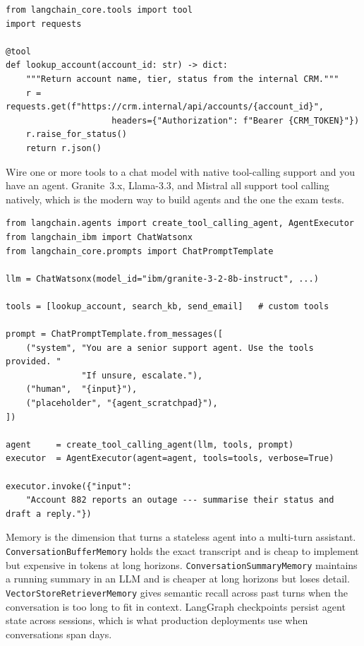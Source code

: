 \begin{examplebox}[title=\textbf{Custom tool --- query an internal CRM}]
\begin{lstlisting}[style=pythonstyle]
from langchain_core.tools import tool
import requests

@tool
def lookup_account(account_id: str) -> dict:
    """Return account name, tier, status from the internal CRM."""
    r = requests.get(f"https://crm.internal/api/accounts/{account_id}",
                     headers={"Authorization": f"Bearer {CRM_TOKEN}"})
    r.raise_for_status()
    return r.json()
\end{lstlisting}
\end{examplebox}

Wire one or more tools to a chat model with native tool-calling support and you have an agent. Granite~3.x, Llama-3.3, and Mistral all support tool calling natively, which is the modern way to build agents and the one the exam tests.

\begin{examplebox}[title=\textbf{Tool-calling agent on watsonx (Granite 3.x supports tool calls natively)}]
\begin{lstlisting}[style=pythonstyle]
from langchain.agents import create_tool_calling_agent, AgentExecutor
from langchain_ibm import ChatWatsonx
from langchain_core.prompts import ChatPromptTemplate

llm = ChatWatsonx(model_id="ibm/granite-3-2-8b-instruct", ...)

tools = [lookup_account, search_kb, send_email]   # custom tools

prompt = ChatPromptTemplate.from_messages([
    ("system", "You are a senior support agent. Use the tools provided. "
               "If unsure, escalate."),
    ("human",  "{input}"),
    ("placeholder", "{agent_scratchpad}"),
])

agent     = create_tool_calling_agent(llm, tools, prompt)
executor  = AgentExecutor(agent=agent, tools=tools, verbose=True)

executor.invoke({"input":
    "Account 882 reports an outage --- summarise their status and draft a reply."})
\end{lstlisting}
\end{examplebox}

Memory is the dimension that turns a stateless agent into a multi-turn assistant. \texttt{ConversationBufferMemory} holds the exact transcript and is cheap to implement but expensive in tokens at long horizons. \texttt{ConversationSummaryMemory} maintains a running summary in an LLM and is cheaper at long horizons but loses detail. \texttt{VectorStoreRetrieverMemory} gives semantic recall across past turns when the conversation is too long to fit in context. LangGraph checkpoints persist agent state across sessions, which is what production deployments use when conversations span days.

